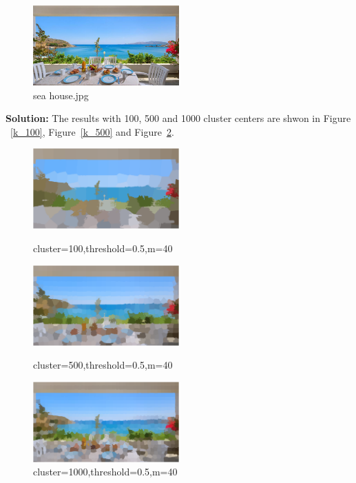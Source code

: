 \documentclass[11pt,letterpaper]{article}
\begin{document}
\begin{figure}[H]
	\centering 
	\includegraphics[width=0.5\textwidth]{sea_house.jpg}
	\caption{sea house.jpg}
	\label{Figure3}
\end{figure}
\textbf{Solution:}
The results with 100, 500 and 1000 cluster centers are shwon in Figure ~\ref{k_100}, Figure~\ref{k_500} and Figure~\ref{k_1000}.
\begin{figure}[hptb]
	\centering
	\includegraphics[width=0.5\textwidth]{../images/p3/k_100_t_0.5_m_40.png}
	\caption{cluster=100,threshold=0.5,m=40}
	\label{k_100}
	\includegraphics[width=0.5\textwidth]{../images/p3/k_500_t_0.5_m_40.png}
	\caption{cluster=500,threshold=0.5,m=40}
	\label{k_500}
	\includegraphics[width=0.5\textwidth]{../images/p3/k_1000_t_0.5_m_40.png}
	\caption{cluster=1000,threshold=0.5,m=40}
	\label{k_1000}
\end{figure}
\end{document}
